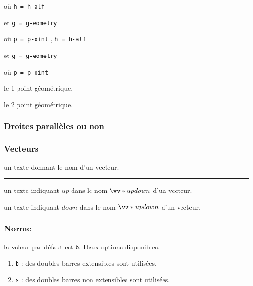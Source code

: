 \documentclass[12pt,a4paper]{article}
\theoremstyle{definition}
\newcommand\separation{
	\medskip
	\hfill\rule{0.5\textwidth}{0.75pt}\hfill
	\medskip
}
\newcommand\extraspace{
	\vspace{0.25em}
}
\newcommand\mwhyprefix[2]{%
	\texttt{#1 = #1-#2}%
}
\begin{document}
   où \quad \mwhyprefix{h}{alf}
                             et \mwhyprefix{g}{eometry}

  où \quad \mwhyprefix{p}{oint},
                                \mwhyprefix{h}{alf}
                             et \mwhyprefix{g}{eometry}

\extraspace


  où \quad \mwhyprefix{p}{oint}

 le 1\ier{} point géométrique.

 le 2\ieme{} point géométrique.





\subsubsection{Droites parallèles ou non}



\extraspace


\subsubsection{Vecteurs}


\IDarg{} un texte donnant le nom d'un vecteur.


\separation



 un texte indiquant $up$ dans le nom $\vect*{up}{down}$ d'un vecteur.

 un texte indiquant $down$ dans le nom $\vect*{up}{down}$ d'un vecteur.
\subsubsection{Norme}


\IDoption{} la valeur par défaut est \verb+b+. Deux options disponibles.
\begin{enumerate}
	\item \verb+b+ : des doubles barres extensibles sont utilisées.

	\item \verb+s+ : des doubles barres non extensibles sont utilisées.
\end{enumerate}
\end{document}
